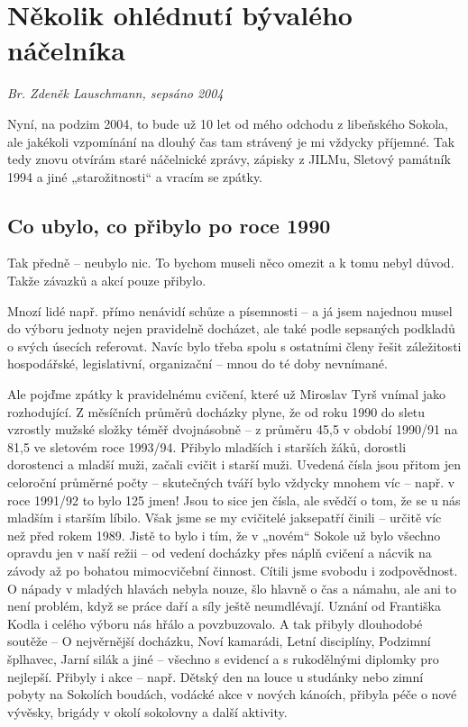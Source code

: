 \section{Několik ohlédnutí bývalého
náčelníka}\label{nux11bkolik-ohluxe9dnutuxed-buxfdvaluxe9ho-nuxe1ux10delnuxedka}

\emph{Br. Zdeněk Lauschmann, sepsáno 2004}

Nyní, na podzim 2004, to bude už 10 let od mého odchodu z libeňského
Sokola, ale jakékoli vzpomínání na dlouhý čas tam strávený je mi vždycky
příjemné. Tak tedy znovu otvírám staré náčelnické zprávy, zápisky z
JILMu, Sletový památník 1994 a jiné „starožitnosti`` a vracím se zpátky.

\subsection{Co ubylo, co přibylo po roce
1990}\label{co-ubylo-co-pux159ibylo-po-roce-1990}

Tak předně -- neubylo nic. To bychom museli něco omezit a k tomu nebyl
důvod. Takže závazků a akcí pouze přibylo.

Mnozí lidé např. přímo nenávidí schůze a písemnosti -- a já jsem
najednou musel do výboru jednoty nejen pravidelně docházet, ale také
podle sepsaných podkladů o svých úsecích referovat. Navíc bylo třeba
spolu s ostatními členy řešit záležitosti hospodářské, legislativní,
organizační -- mnou do té doby nevnímané.

Ale pojďme zpátky k pravidelnému cvičení, které už Miroslav Tyrš vnímal
jako rozhodující. Z měsíčních průměrů docházky plyne, že od roku 1990 do
sletu vzrostly mužské složky téměř dvojnásobně -- z průměru 45,5 v
období 1990/91 na 81,5 ve sletovém roce 1993/94. Přibylo mladších i
starších žáků, dorostli dorostenci a mladší muži, začali cvičit i starší
muži. Uvedená čísla jsou přitom jen celoroční průměrné počty --
skutečných tváří bylo vždycky mnohem víc -- např. v roce 1991/92 to bylo
125 jmen! Jsou to sice jen čísla, ale svědčí o tom, že se u nás mladším
i starším líbilo. Však jsme se my cvičitelé jaksepatří činili -- určitě
víc než před rokem 1989. Jistě to bylo i tím, že v „novém`` Sokole už
bylo všechno opravdu jen v naší režii -- od vedení docházky přes náplň
cvičení a nácvik na závody až po bohatou mimocvičební činnost. Cítili
jsme svobodu i zodpovědnost. O nápady v mladých hlavách nebyla nouze,
šlo hlavně o čas a námahu, ale ani to není problém, když se práce daří a
síly ještě neumdlévají. Uznání od Františka Kodla i celého výboru nás
hřálo a povzbuzovalo. A tak přibyly dlouhodobé soutěže -- O nejvěrnější
docházku, Noví kamarádi, Letní disciplíny, Podzimní šplhavec, Jarní
silák a jiné -- všechno s evidencí a s rukodělnými diplomky pro
nejlepší. Přibyly i akce -- např. Dětský den na louce u studánky nebo
zimní pobyty na Sokolích boudách, vodácké akce v nových kánoích, přibyla
péče o nové vývěsky, brigády v okolí sokolovny a další aktivity.

